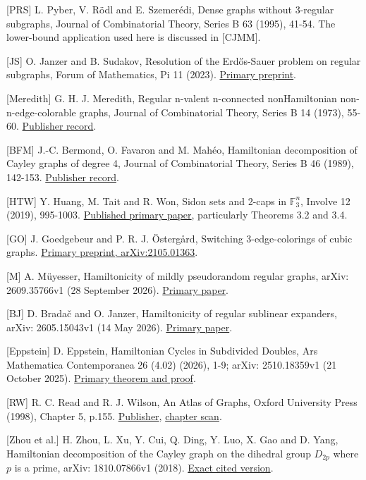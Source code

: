 \documentclass[
  11pt,
]{article}
\begin{document}
{[}PRS{]} L. Pyber, V. Rödl and E. Szemerédi, Dense graphs without
3-regular subgraphs, Journal of Combinatorial Theory, Series B 63
(1995), 41-54. The lower-bound application used here is discussed in
{[}CJMM{]}.

{[}JS{]} O. Janzer and B. Sudakov, Resolution of the Erdős-Sauer problem
on regular subgraphs, Forum of Mathematics, Pi 11 (2023).
\href{https://arxiv.org/abs/2204.12455}{Primary preprint}.

{[}Meredith{]} G. H. J. Meredith, Regular n-valent n-connected
nonHamiltonian non-n-edge-colorable graphs, Journal of Combinatorial
Theory, Series B 14 (1973), 55-60.
\href{https://doi.org/10.1016/S0095-8956(73)80006-1}{Publisher record}.

{[}BFM{]} J.-C. Bermond, O. Favaron and M. Mahéo, Hamiltonian
decomposition of Cayley graphs of degree 4, Journal of Combinatorial
Theory, Series B 46 (1989), 142-153.
\href{https://doi.org/10.1016/0095-8956(89)90040-3}{Publisher record}.

{[}HTW{]} Y. Huang, M. Tait and R. Won, Sidon sets and 2-caps in
\(\mathbb F_3^n\), Involve 12 (2019), 995-1003.
\href{https://msp.org/involve/2019/12-6/involve-v12-n6-p06-p.pdf}{Published
primary paper}, particularly Theorems 3.2 and 3.4.

{[}GO{]} J. Goedgebeur and P. R. J. Östergård, Switching
3-edge-colorings of cubic graphs.
\href{https://arxiv.org/abs/2105.01363}{Primary preprint,
arXiv:2105.01363}.

{[}M{]} A. Müyesser, Hamiltonicity of mildly pseudorandom regular
graphs, arXiv: 2609.35766v1 (28 September 2026).
\href{https://arxiv.org/html/2609.35766v1}{Primary paper}.

{[}BJ{]} D. Bradač and O. Janzer, Hamiltonicity of regular sublinear
expanders, arXiv: 2605.15043v1 (14 May 2026).
\href{https://arxiv.org/html/2605.15043v1}{Primary paper}.

{[}Eppstein{]} D. Eppstein, Hamiltonian Cycles in Subdivided Doubles,
Ars Mathematica Contemporanea 26 (4.02) (2026), 1-9; arXiv: 2510.18359v1
(21 October 2025). \href{https://arxiv.org/html/2510.18359v1}{Primary
theorem and proof}.

{[}RW{]} R. C. Read and R. J. Wilson, An Atlas of Graphs, Oxford
University Press (1998), Chapter 5, p.155.
\href{https://academic.oup.com/book/54439}{Publisher},
\href{https://oeis.org/A000088/a000088_14.pdf}{chapter scan}.

{[}Zhou et al.{]} H. Zhou, L. Xu, Y. Cui, Q. Ding, Y. Luo, X. Gao and D.
Yang, Hamiltonian decomposition of the Cayley graph on the dihedral
group \(D_{2p}\) where \(p\) is a prime, arXiv: 1810.07866v1 (2018).
\href{https://arxiv.org/html/1810.07866v1}{Exact cited version}.
\end{document}
